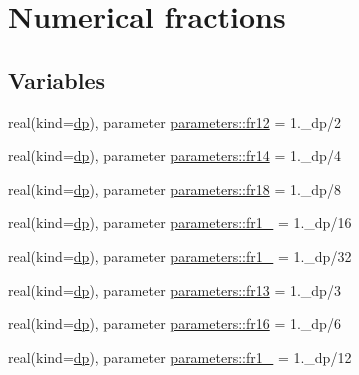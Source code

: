 \hypertarget{group__FRACTIONS}{}\section{Numerical fractions}
\label{group__FRACTIONS}
\subsection*{Variables}
\begin{DoxyCompactItemize}
\item 
real(kind=\mbox{\hyperlink{namespaceparameters_a52f8c6351fd79345d8811e065bcbbb37}{dp}}), parameter \mbox{\hyperlink{group__FRACTIONS_ga22877764fb6363b2fa930793c57a03da}{parameters\+::fr12}} = 1.\+\_\+dp/2
\item 
real(kind=\mbox{\hyperlink{namespaceparameters_a52f8c6351fd79345d8811e065bcbbb37}{dp}}), parameter \mbox{\hyperlink{group__FRACTIONS_gaffec0a7933c65703944576ebea0c1cd1}{parameters\+::fr14}} = 1.\+\_\+dp/4
\item 
real(kind=\mbox{\hyperlink{namespaceparameters_a52f8c6351fd79345d8811e065bcbbb37}{dp}}), parameter \mbox{\hyperlink{group__FRACTIONS_ga59c72e10a23b892113d106b25c1f60d7}{parameters\+::fr18}} = 1.\+\_\+dp/8
\item 
real(kind=\mbox{\hyperlink{namespaceparameters_a52f8c6351fd79345d8811e065bcbbb37}{dp}}), parameter \mbox{\hyperlink{group__FRACTIONS_ga49bc50cd5025d08ac8f93efb9d2f2c57}{parameters\+::fr1\+\_}} = 1.\+\_\+dp/16
\item 
real(kind=\mbox{\hyperlink{namespaceparameters_a52f8c6351fd79345d8811e065bcbbb37}{dp}}), parameter \mbox{\hyperlink{group__FRACTIONS_ga9d703cf8cb03df7ac75c98494659c894}{parameters\+::fr1\+\_}} = 1.\+\_\+dp/32
\item 
real(kind=\mbox{\hyperlink{namespaceparameters_a52f8c6351fd79345d8811e065bcbbb37}{dp}}), parameter \mbox{\hyperlink{group__FRACTIONS_ga7012f1eaa8d54fce4923459913c9ea89}{parameters\+::fr13}} = 1.\+\_\+dp/3
\item 
real(kind=\mbox{\hyperlink{namespaceparameters_a52f8c6351fd79345d8811e065bcbbb37}{dp}}), parameter \mbox{\hyperlink{group__FRACTIONS_ga67d2b3b04777af92b519826b97ce69a4}{parameters\+::fr16}} = 1.\+\_\+dp/6
\item 
real(kind=\mbox{\hyperlink{namespaceparameters_a52f8c6351fd79345d8811e065bcbbb37}{dp}}), parameter \mbox{\hyperlink{group__FRACTIONS_gaa8dad9cec662853b1633da29ad89f6aa}{parameters\+::fr1\+\_}} = 1.\+\_\+dp/12
\item 

\end{DoxyCompactItemize}
